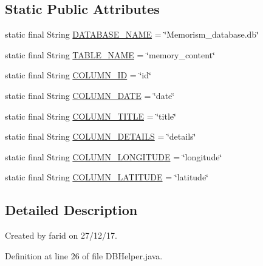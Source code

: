 \subsection*{Static Public Attributes}
\begin{DoxyCompactItemize}
\item 
static final String \hyperlink{classcom_1_1example_1_1memorism_1_1memory_1_1_d_b_helper_a61a19ee13881d07c502373a34687d671}{D\+A\+T\+A\+B\+A\+S\+E\+\_\+\+N\+A\+ME} = \char`\"{}Memorism\+\_\+database.\+db\char`\"{}
\item 
static final String \hyperlink{classcom_1_1example_1_1memorism_1_1memory_1_1_d_b_helper_afb514eee57c4fe21a7c1b7c9c72747a0}{T\+A\+B\+L\+E\+\_\+\+N\+A\+ME} = \char`\"{}memory\+\_\+content\char`\"{}
\item 
static final String \hyperlink{classcom_1_1example_1_1memorism_1_1memory_1_1_d_b_helper_a12593a1ae6e3c03afbc9d108b7c59dff}{C\+O\+L\+U\+M\+N\+\_\+\+ID} = \char`\"{}id\char`\"{}
\item 
static final String \hyperlink{classcom_1_1example_1_1memorism_1_1memory_1_1_d_b_helper_a78ff1252868691cc74b9a20b44849ea5}{C\+O\+L\+U\+M\+N\+\_\+\+D\+A\+TE} = \char`\"{}date\char`\"{}
\item 
static final String \hyperlink{classcom_1_1example_1_1memorism_1_1memory_1_1_d_b_helper_ab96886bfdaf0e3551201f4e03f1e4ad0}{C\+O\+L\+U\+M\+N\+\_\+\+T\+I\+T\+LE} = \char`\"{}title\char`\"{}
\item 
static final String \hyperlink{classcom_1_1example_1_1memorism_1_1memory_1_1_d_b_helper_a43bb30fdefc54ee809ff8517fb0cdbfc}{C\+O\+L\+U\+M\+N\+\_\+\+D\+E\+T\+A\+I\+LS} = \char`\"{}details\char`\"{}
\item 
static final String \hyperlink{classcom_1_1example_1_1memorism_1_1memory_1_1_d_b_helper_a853f90958b6e860ffa3fea8c315b7c26}{C\+O\+L\+U\+M\+N\+\_\+\+L\+O\+N\+G\+I\+T\+U\+DE} = \char`\"{}longitude\char`\"{}
\item 
static final String \hyperlink{classcom_1_1example_1_1memorism_1_1memory_1_1_d_b_helper_aef173dee96dd1d3292ed86bc1394fb37}{C\+O\+L\+U\+M\+N\+\_\+\+L\+A\+T\+I\+T\+U\+DE} = \char`\"{}latitude\char`\"{}
\end{DoxyCompactItemize}


\subsection{Detailed Description}
Created by farid on 27/12/17. 

Definition at line 26 of file D\+B\+Helper.\+java.



